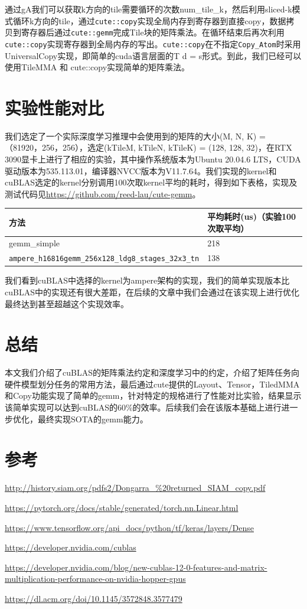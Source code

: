 通过gA我们可以获取k方向的tile需要循环的次数num\_tile\_k，然后利用sliced-k模式循环k方向的tile，通过\lstinline|cute::copy|实现全局内存到寄存器到直接copy，数据拷贝到寄存器后通过\lstinline|cute::gemm|完成Tile块的矩阵乘法。在循环结束后再次利用\lstinline|cute::copy|实现寄存器到全局内存的写出。\lstinline|cute::copy|在不指定\lstinline|Copy_Atom|时采用UniversalCopy实现，即简单的cuda语言层面的T d = s形式。到此，我们已经可以使用TileMMA 和 cute::copy实现简单的矩阵乘法。

\section{实验性能对比}

我们选定了一个实际深度学习推理中会使用到的矩阵的大小(M, N, K) = （81920，256，256），选定(kTileM, kTileN, kTileK) = (128, 128, 32)，在RTX 3090显卡上进行了相应的实验，其中操作系统版本为Ubuntu 20.04.6 LTS，CUDA 驱动版本为535.113.01，编译器NVCC版本为V11.7.64。我们实现的kernel和cuBLAS选定的kernel分别调用100次取kernel平均的耗时，得到如下表格，实现及测试代码见\url{https://github.com/reed-lau/cute-gemm}。

\begin{table}[htbp]
\centering
\begin{tabular}{ll}
\toprule
方法 & 平均耗时(us)（实验100次取平均） \\
\midrule
gemm\_simple & 218 \\
\lstinline|ampere_h16816gemm_256x128_ldg8_stages_32x3_tn| & 138 \\
\bottomrule
\end{tabular}
\end{table}

我们看到cuBLAS中选择的kernel为ampere架构的实现，我们的简单实现版本比cuBLAS中的实现还有很大差距，在后续的文章中我们会通过在该实现上进行优化最终达到甚至超越这个实现效率。

\section{总结}

本文我们介绍了cuBLAS的矩阵乘法约定和深度学习中的约定，介绍了矩阵任务向硬件模型划分任务的常用方法，最后通过cute提供的Layout、Tensor，TiledMMA和Copy功能实现了简单的gemm，针对特定的规格进行了性能对比实验，结果显示该简单实现可以达到cuBLAS的60\%的效率。后续我们会在该版本基础上进行进一步优化，最终实现SOTA的gemm能力。

\section{参考}

\url{http://history.siam.org/pdfs2/Dongarra_%20returned_SIAM_copy.pdf}

\url{https://pytorch.org/docs/stable/generated/torch.nn.Linear.html}

\url{https://www.tensorflow.org/api_docs/python/tf/keras/layers/Dense}

\url{https://developer.nvidia.com/cublas}

\url{https://developer.nvidia.com/blog/new-cublas-12-0-features-and-matrix-multiplication-performance-on-nvidia-hopper-gpus}

\url{https://dl.acm.org/doi/10.1145/3572848.3577479}
